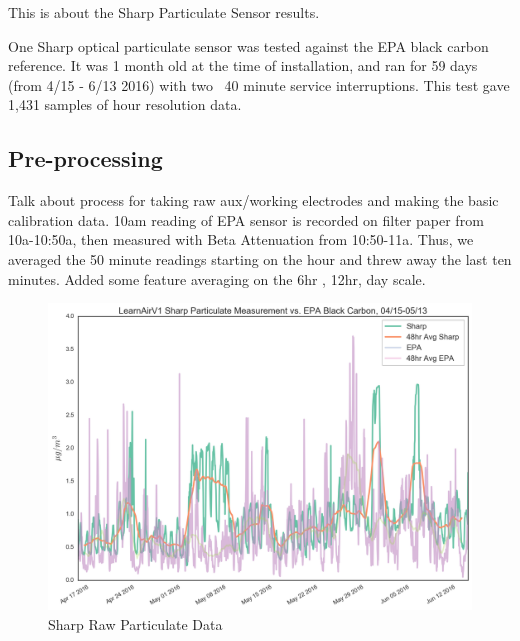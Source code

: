 This is about the Sharp Particulate Sensor results.

One Sharp optical particulate sensor was tested against the EPA black carbon reference.  It was 1 month old at the time of installation, and ran for 59 days (from 4/15 - 6/13 2016) with two ~40 minute service interruptions.  This test gave 1,431 samples of hour resolution data.


\subsection{Pre-processing}

Talk about process for taking raw aux/working electrodes and making the basic calibration data.
10am reading of EPA sensor is recorded on filter paper from 10a-10:50a, then measured with Beta Attenuation from 10:50-11a.  Thus, we averaged the 50 minute readings starting on the hour and threw away the last ten minutes.  Added some feature averaging on the 6hr , 12hr, day scale.

\begin{figure}[htb]
 	\includegraphics[width=\textwidth]{figs/sharp_raw}               
 	 \caption{Sharp Raw Particulate Data}
  	\label{fig:sharp_raw}
\end{figure}


